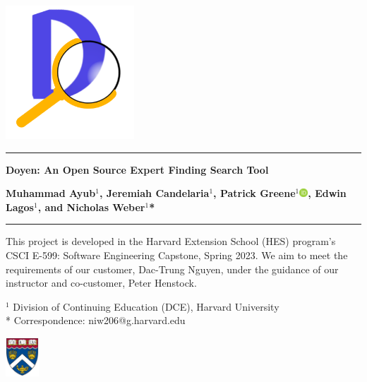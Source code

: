 \begin{titlepage}
    \def\defaultparindent{\parindent}
    \setlength{\parindent}{0cm}

    \begin{center}
        \includegraphics[keepaspectratio,height=5cm]{Images/doyen-logo-new.png}\label{fig:doyen}
    \end{center}

    \hrule
    \begin{tcolorbox}[colback=doyen-primary-dark]
    \color{white}
    \vspace*{1cm}
    \Large
    \textbf{Doyen: An Open Source Expert Finding Search Tool}
    \vspace{0.8cm}
    
    \normalsize

    \textbf{Muhammad Ayub$^{1}$, Jeremiah Candelaria$^{1}$, Patrick Greene$^{1}$\href{https://orcid.org/0000-0001-7052-0608}{\includegraphics[width=0.32cm]{Images/logo-orcid.pdf}}, Edwin Lagos$^{1}$, and Nicholas Weber$^{1}$*}
    \vspace{0.8cm}
    \end{tcolorbox}
    \hrule
    \vspace{1.5cm}
    
    This project is developed in the Harvard Extension School (HES) program's CSCI E-599: Software Engineering Capstone, Spring 2023. We aim to meet the requirements of our customer, Dac-Trung Nguyen, under the guidance of our instructor and co-customer, Peter Henstock. 
 
    \vspace{0.8cm}
    
    $^{1}$ Division of Continuing Education (DCE), Harvard University \\
    * Correspondence: niw206@g.harvard.edu

    \begin{center}
        \includegraphics[keepaspectratio,height=1.45cm]{Images/hes-logo.png}\label{fig:hes}
    \end{center}


\end{titlepage}
